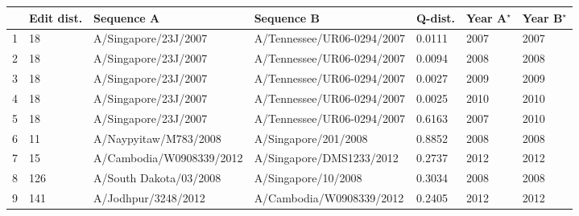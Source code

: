 \begin{tabular}{L{.1in}|L{.45in}|L{1.85in}|L{2in}|L{.5in}|L{.325in}|L{.325in}}\hline
& Edit dist. & Sequence A & Sequence B & Q-dist. & Year A$^\star$ & Year B$^\star$\\\hline
\rowcolor{\ACOL}1&18 & A/Singapore/23J/2007 & A/Tennessee/UR06-0294/2007 & 0.0111 & 2007 & 2007\\\hline
\rowcolor{\ACOL}2&18 & A/Singapore/23J/2007 & A/Tennessee/UR06-0294/2007 & 0.0094 & 2008 & 2008\\\hline
\rowcolor{\ACOL}3&18 & A/Singapore/23J/2007 & A/Tennessee/UR06-0294/2007 & 0.0027 & 2009 & 2009\\\hline
\rowcolor{\ACOL}4&18 & A/Singapore/23J/2007 & A/Tennessee/UR06-0294/2007 & 0.0025 & 2010 & 2010\\\hline
\rowcolor{\ACOL}5&18 & A/Singapore/23J/2007 & A/Tennessee/UR06-0294/2007 & 0.6163 & 2007 & 2010\\\hline
\rowcolor{\BCOL}6&11 & A/Naypyitaw/M783/2008 & A/Singapore/201/2008 &      0.8852 & 2008 & 2008\\\hline
\rowcolor{\BCOL}7&15 & A/Cambodia/W0908339/2012 & A/Singapore/DMS1233/2012&0.2737 & 2012 & 2012\\\hline
\rowcolor{\CCOL}8&126 & A/South Dakota/03/2008 & A/Singapore/10/2008 &     0.3034 & 2008 & 2008\\\hline
\rowcolor{\CCOL}9&141 & A/Jodhpur/3248/2012 & A/Cambodia/W0908339/2012 &   0.2405 & 2012 & 2012\\\hline
\end{tabular}